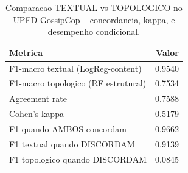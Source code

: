 \begin{table}[H]\centering
\caption{Comparacao TEXTUAL vs TOPOLOGICO no UPFD-GossipCop -- concordancia, kappa, e desempenho condicional.}
\label{tab:concordancia_gossipcop}
\begin{tabular}{lr}
\toprule
Metrica & Valor \\
\midrule
F1-macro textual (LogReg-content) & 0.9540 \\
F1-macro topologico (RF estrutural) & 0.7534 \\
Agreement rate & 0.7588 \\
Cohen's kappa & 0.5179 \\
F1 quando AMBOS concordam & 0.9662 \\
F1 textual quando DISCORDAM & 0.9139 \\
F1 topologico quando DISCORDAM & 0.0845 \\
\bottomrule
\end{tabular}
\end{table}